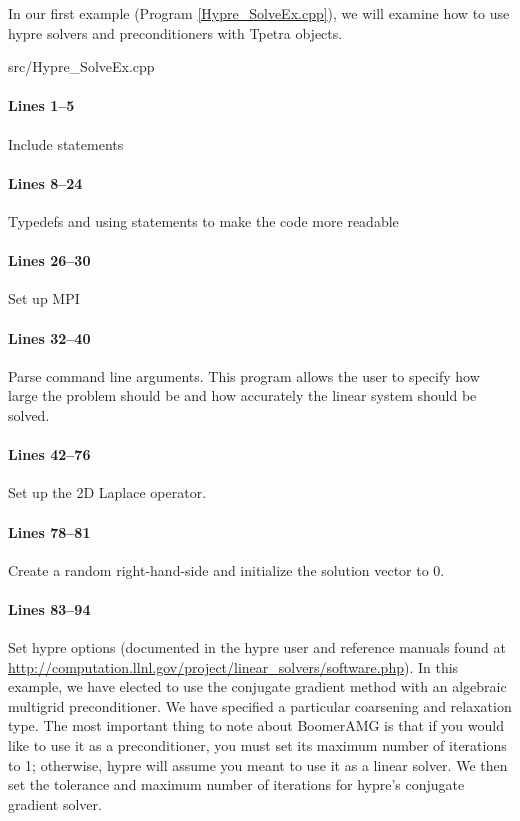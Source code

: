 In our first example (Program \ref{Hypre_SolveEx.cpp}), we will examine how
to use hypre solvers and preconditioners with Tpetra objects.

\begin{lstinputlisting}[caption=Hypre\_SolveEx.cpp,label=Hypre_SolveEx.cpp]{src/Hypre_SolveEx.cpp}
\end{lstinputlisting}

\paragraph{Lines 1--5}
Include statements

\paragraph{Lines 8--24}
Typedefs and using statements to make the code more readable

\paragraph{Lines 26--30}
Set up MPI

\paragraph{Lines 32--40}
Parse command line arguments.  This program allows the user to specify how large
the problem should be and how accurately the linear system should be solved.

\paragraph{Lines 42--76}
Set up the 2D Laplace operator.

\paragraph{Lines 78--81}
Create a random right-hand-side and initialize the solution vector to 0.

\paragraph{Lines 83--94}
Set hypre options (documented in the hypre user and reference manuals found at
\url{http://computation.llnl.gov/project/linear_solvers/software.php}). In this
example, we have elected to use the conjugate gradient method with an algebraic
multigrid preconditioner.  We have specified a particular coarsening and
relaxation type.  The most important thing to note about BoomerAMG is that if
you would like to use it as a preconditioner, you must set its maximum number of
iterations to 1; otherwise, hypre will assume you meant to use it as a linear
solver.  We then set the tolerance and maximum number of iterations for hypre's
conjugate gradient solver.

